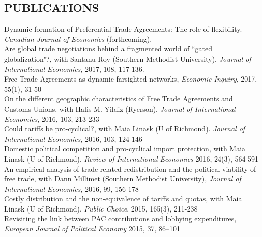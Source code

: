 \documentclass[11pt]{res}
\begin{document}
\begin{resume}
\section{PUBLICATIONS}\vspace{1.5mm}
{Dynamic formation of Preferential Trade Agreements: The role of flexibility}. \emph{Canadian Journal of Economics} (forthcoming). \vspace{1.5mm}\\
{Are global trade negotiations behind a fragmented world of ``gated globalization"?}, with Santanu Roy (Southern Methodist University). \emph{Journal of International Economics}, 2017, 108, 117-136.\vspace{1.5mm}\\
{ Free Trade Agreements as dynamic farsighted networks}, \emph{Economic Inquiry}, 2017, 55(1), 31-50\vspace{1.5mm}\\
{On the different geographic characteristics of Free Trade Agreements and Customs Unions}, with Halis M. Yildiz (Ryerson). \emph{Journal of International Economics}, 2016, 103, 213-233 \vspace{1.5mm}\\
{Could tariffs be pro-cyclical?}, with Maia Linask (U of Richmond). \emph{Journal of International Economics}, 2016, 103, 124-146 \vspace{1.5mm}\\


{Domestic political competition and pro-cyclical import protection}, with Maia Linask (U of Richmond), \emph{Review of International Economics} 2016, 24(3), 564-591\vspace{1.5mm}\\
{An empirical analysis of trade related redistribution and the political viability of free trade}, with Dann Millimet (Southern Methodist University), \emph{Journal of International Economics}, 2016, 99, 156-178 \vspace{1.5mm}\\
{Costly distribution and the non-equivalence of tariffs and quotas}, with Maia Linask (U of Richmond), \emph{Public Choice}, 2015, 165(3), 211-238 \vspace{1.5mm}\\
{Revisiting the link between PAC contributions and lobbying expenditures, \emph{European Journal of Political Economy}} 2015, 37, 86--101


\end{resume}
\end{document}

